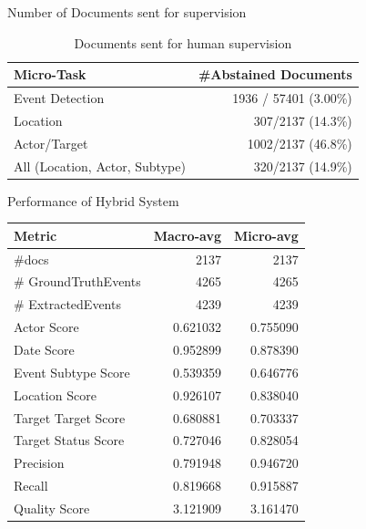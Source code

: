 
\begin{frame}{Number of Documents sent for supervision}
\begin{table}
    \centering
    \small
    \begin{tabular}{l|r}
    \toprule
       \textbf{Micro-Task}  & \textbf{\#Abstained Documents} \\
    \midrule
       Event Detection &  1936 / 57401 (3.00\%) \\
       Location  & 307/2137 (14.3\%) \\
       Actor/Target & 1002/2137 (46.8\%) \\
       All (Location, Actor, Subtype) & 320/2137 (14.9\%) \\
    \bottomrule
    \end{tabular}
    \caption{Documents sent for human supervision}
    \label{tab:abstPerMicro}
\end{table}
\end{frame}

\begin{frame}{Performance of Hybrid System}
    \begin{table}[]
    \centering
    \begin{tabular}{lrr}
\toprule
              Metric &    Macro-avg &    Micro-avg \\
\midrule
               \#docs &  2137 &  2137 \\
 \# GroundTruthEvents &  4265 &  4265 \\
   \# ExtractedEvents &  4239 &  4239 \\
         Actor Score &     0.621032 &     0.755090 \\
          Date Score &     0.952899 &     0.878390 \\
 Event Subtype Score &     0.539359 &     0.646776 \\
      Location Score &     0.926107 &     0.838040 \\
 Target Target Score &     0.680881 &     0.703337 \\
 Target Status Score &     0.727046 &     0.828054 \\
           Precision &     0.791948 &     0.946720 \\
              Recall &     0.819668 &     0.915887 \\
       Quality Score &     3.121909 &     3.161470 \\
\bottomrule
\end{tabular}
    \label{tab:hybridPerf}
\end{table}
\end{frame}

